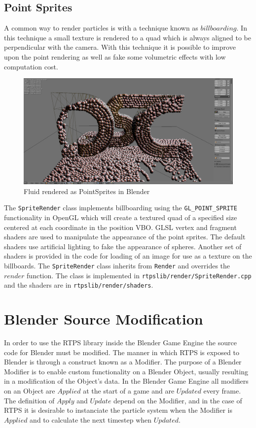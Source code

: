 \subsection{Point Sprites}
A common way to render particles is with a technique known as $billboarding$.
In this technique a small texture is rendered to a quad which is always aligned
to be perpendicular with the camera. With this technique it is possible to
improve upon the point rendering as well as fake some volumetric effects with
low computation cost.

\begin{figure}[!htc]
 		\centering
		\includegraphics[scale=0.2]{figures/pointsprites.png}
        \caption{ Fluid rendered as PointSprites in Blender }
		\label{fig:pointsprites}
\end{figure}


The \verb|SpriteRender| class implements billboarding using the
\verb|GL_POINT_SPRITE| functionality in OpenGL which will create a textured quad
of a specified size centered at each coordinate in the position VBO. GLSL
vertex and fragment shaders are used to manipulate the appearance of the point
sprites. The default shaders use artificial lighting to fake the appearance of
spheres. Another set of shaders is provided in the code for loading of an image
for use as a texture on the billboards. The \verb|SpriteRender| class inherits
from \verb|Render| and overrides the $render$ function. The class is
implemented in \verb|rtpslib/render/SpriteRender.cpp| and the shaders are in
\verb|rtpslib/render/shaders|.


\section{Blender Source Modification}

In order to use the RTPS library inside the Blender Game Engine the source code
for Blender must be modified. The manner in which RTPS is exposed to Blender is
through a construct known as a Modifier. The purpose of a Blender Modifier is
to enable custom functionality on a Blender Object, usually resulting in a
modification of the Object's data. In the Blender Game Engine all modifiers on an Object are
$Applied$ at the start of a game and are $Updated$ every frame. The definition
of $Apply$ and $Update$ depend on the Modifier, and in the case of RTPS it is
desirable to instanciate the particle system when the Modifier is $Applied$ and
to calculate the next timestep when $Updated$.


